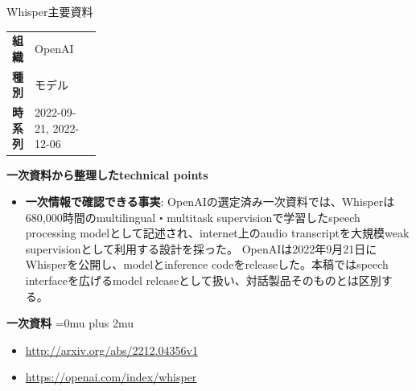 \begin{technicalnote}{Whisper}{主要資料}
\begingroup
\begin{tabularx}{\linewidth}{@{}>{\bfseries}p{0.22\linewidth}X@{}}
組織 & OpenAI \\
種別 & モデル \\
時系列 & 2022-09-21, 2022-12-06 \\
\end{tabularx}
\smallskip
{\bfseries 一次資料から整理したtechnical points}
\begin{itemize}[leftmargin=1.5em,itemsep=0.35em]
\item \textbf{一次情報で確認できる事実}: OpenAIの選定済み一次資料では、Whisperは680,000時間のmultilingual・multitask supervisionで学習したspeech processing modelとして記述され、internet上のaudio transcriptを大規模weak supervisionとして利用する設計を採った。 OpenAIは2022年9月21日にWhisperを公開し、modelとinference codeをreleaseした。本稿ではspeech interfaceを広げるmodel releaseとして扱い、対話製品そのものとは区別する。
\end{itemize}
\begin{minipage}{\linewidth}
\begin{samepage}
{\bfseries 一次資料}
\begingroup\sloppy
\Urlmuskip=0mu plus 2mu\relax
\begin{itemize}[leftmargin=1.5em,itemsep=0.25em]
\item {\scriptsize\url{http://arxiv.org/abs/2212.04356v1}}
\item {\scriptsize\url{https://openai.com/index/whisper}}
\end{itemize}
\endgroup
\end{samepage}
\end{minipage}
\endgroup
\end{technicalnote}
\medskip

